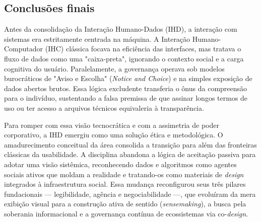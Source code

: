\documentclass[
	12pt,				%
	oneside,			%
	a4paper,			%
	english,			%
	brazil				%
	]{abntex2ppgsi}
\begin{document}


    \subsection{Conclusões finais}\label{ConcluFinaisRSL} 

    Antes da consolidação da Interação Humano-Dados (IHD), a interação com sistemas era estritamente centrada na máquina. A Interação Humano-Computador (IHC) clássica focava na eficiência das interfaces, mas tratava o fluxo de dados como uma "caixa-preta", ignorando o contexto social e a carga cognitiva do usuário. Paralelamente, a governança operava sob modelos burocráticos de "Aviso e Escolha" (\textit{Notice and Choice}) e na simples exposição de dados abertos brutos. Essa lógica excludente transferia o ônus da compreensão para o indivíduo, sustentando a falsa premissa de que assinar longos termos de uso ou ter acesso a arquivos técnicos equivaleria à transparência.

    Para romper com essa visão tecnocrática e com a assimetria de poder corporativo, a IHD emergiu como uma solução ética e metodológica. O amadurecimento conceitual da área consolida a transição para além das fronteiras clássicas da usabilidade. A disciplina abandona a lógica de aceitação passiva para adotar uma visão sistêmica, reconhecendo dados e algoritmos como agentes sociais ativos que moldam a realidade e tratando-os como materiais de \textit{design} integrados à infraestrutura social. Essa mudança reconfigurou seus três pilares fundacionais — legibilidade, agência e negociabilidade —, que evoluíram da mera exibição visual para a construção ativa de sentido (\textit{sensemaking}), a busca pela soberania informacional e a governança contínua de ecossistemas via co-\textit{design}.
\end{document}
